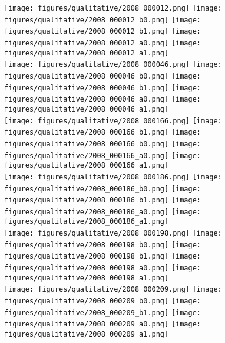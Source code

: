 \documentclass[runningheads]{llncs}
\begin{document}
\begin{figure}[]
\begin{minipage}{0.4\textwidth}
\begin{minipage}{0.5\textwidth}
\begin{figure*}
 \centering
\texttt{[image: figures/qualitative/2008\_000012.png]}
\texttt{[image: figures/qualitative/2008\_000012\_b0.png]}
\texttt{[image: figures/qualitative/2008\_000012\_b1.png]}
\texttt{[image: figures/qualitative/2008\_000012\_a0.png]}
\texttt{[image: figures/qualitative/2008\_000012\_a1.png]}\\
\texttt{[image: figures/qualitative/2008\_000046.png]}
\texttt{[image: figures/qualitative/2008\_000046\_b0.png]}
\texttt{[image: figures/qualitative/2008\_000046\_b1.png]}
\texttt{[image: figures/qualitative/2008\_000046\_a0.png]}
\texttt{[image: figures/qualitative/2008\_000046\_a1.png]}\\
\texttt{[image: figures/qualitative/2008\_000166.png]}
\texttt{[image: figures/qualitative/2008\_000166\_b1.png]}
\texttt{[image: figures/qualitative/2008\_000166\_b0.png]}
\texttt{[image: figures/qualitative/2008\_000166\_a0.png]}
\texttt{[image: figures/qualitative/2008\_000166\_a1.png]}\\
\texttt{[image: figures/qualitative/2008\_000186.png]}
\texttt{[image: figures/qualitative/2008\_000186\_b0.png]}
\texttt{[image: figures/qualitative/2008\_000186\_b1.png]}
\texttt{[image: figures/qualitative/2008\_000186\_a0.png]}
\texttt{[image: figures/qualitative/2008\_000186\_a1.png]}\\
\texttt{[image: figures/qualitative/2008\_000198.png]}
\texttt{[image: figures/qualitative/2008\_000198\_b0.png]}
\texttt{[image: figures/qualitative/2008\_000198\_b1.png]}
\texttt{[image: figures/qualitative/2008\_000198\_a0.png]}
\texttt{[image: figures/qualitative/2008\_000198\_a1.png]}\\
\texttt{[image: figures/qualitative/2008\_000209.png]}
\texttt{[image: figures/qualitative/2008\_000209\_b0.png]}
\texttt{[image: figures/qualitative/2008\_000209\_b1.png]}
\texttt{[image: figures/qualitative/2008\_000209\_a0.png]}
\texttt{[image: figures/qualitative/2008\_000209\_a1.png]}\\

\end{figure*}
\end{minipage}
\end{minipage}
\end{figure}
\end{document}
